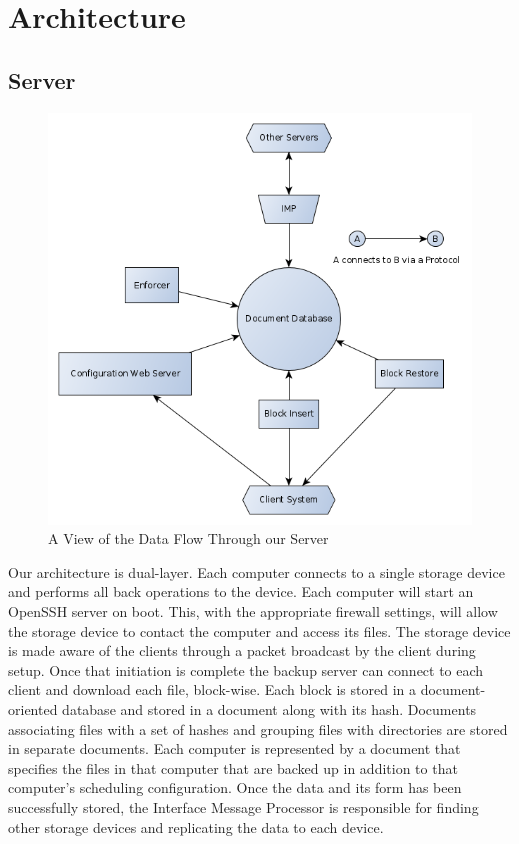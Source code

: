 \chapter{Architecture}
\section{Server}

\begin{figure}[hb]
\centering
\includegraphics[scale=0.5]{images/architechure-diagram.png}
\caption{A View of the Data Flow Through our Server}
\end{figure}

Our architecture is dual-layer. Each computer connects to a single storage
device and performs all back operations to the device. Each computer will start
an OpenSSH server on boot. This, with the appropriate firewall settings, will
allow the storage device to contact the computer and access its files. The
storage device is made aware of the clients through a packet broadcast by the
client during setup. Once that initiation is complete the backup server can
connect to each client and download each file, block-wise. Each block is stored
in a document-oriented database and stored in a document along with its hash.
Documents associating files with a set of hashes and grouping files with
directories are stored in separate documents. Each computer is represented by a
document that specifies the files in that computer that are backed up in
addition to that computer's scheduling configuration. Once the data and its form
has been successfully stored, the Interface Message Processor is responsible for
finding other storage devices and replicating the data to each device.

